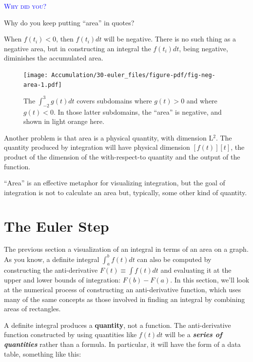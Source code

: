 \documentclass[
  letterpaper,
  DIV=11,
  numbers=noendperiod,
  oneside]{scrreprt}
\newenvironment{why}%
{%
\textcolor{blue}{\hrulefill}%
  \par\vspace{.3\baselineskip}%
  \textcolor{blue}{\scshape Why did you?}%
  \par\vspace{\baselineskip}%
}%
{\textcolor{blue}{\hrulefill}}
\begin{document}
\begin{why}
Why do you keep putting ``area'' in quotes?

When \(f(t_i) < 0\), then \(f(t_i) dt\) will be negative. There is no
such thing as a negative area, but in constructing an integral the
\(f(t_i)dt\), being negative, diminishes the accumulated area.

\begin{figure}

{\centering \texttt{[image: Accumulation/30-euler\_files/figure-pdf/fig-neg-area-1.pdf]}

}

\caption{\label{fig-neg-area}The \(\int_{-2}^3 g(t) dt\) covers
subdomains where \(g(t) > 0\) and where \(g(t) < 0\). In those latter
subdomains, the ``area'' is negative, and shown in light orange here.}

\end{figure}

Another problem is that area is a physical quantity, with dimension
L\(^2\). The quantity produced by integration will have physical
dimension \([f(t)][t]\), the product of the dimension of the
with-respect-to quantity and the output of the function.

``Area'' is an effective metaphor for visualizing integration, but the
goal of integration is not to calculate an area but, typically, some
other kind of quantity.

\end{why}

\hypertarget{the-euler-step}{%
\section{The Euler Step}\label{the-euler-step}}

The previous section a visualization of an integral in terms of an area
on a graph. As you know, a definite integral \(\int_a^b f(t) dt\) can
also be computed by constructing the anti-derivative
\(F(t) \equiv \int f(t) dt\) and evaluating it at the upper and lower
bounds of integration: \(F(b) - F(a)\). In this section, we'll look at
the numerical process of constructing an anti-derivative function, which
uses many of the same concepts as those involved in finding an integral
by combining areas of rectangles.

A definite integral produces a \textbf{quantity}, not a function. The
anti-derivative function constructed by using quantities like
\(f(t) dt\) will be a \textbf{\emph{series of quantities}} rather than a
formula. In particular, it will have the form of a data table, something
like this:
\end{document}
